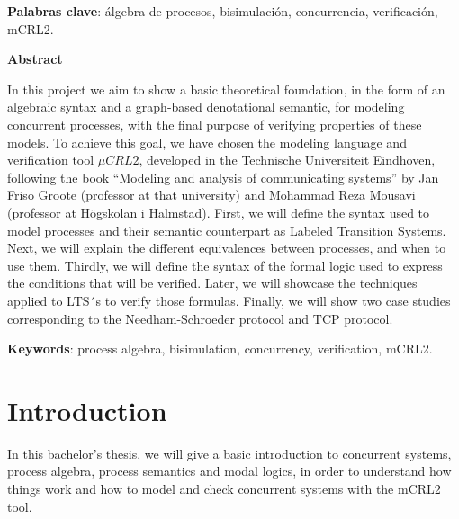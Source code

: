 \documentclass[11pt]{article}
\theoremstyle{definition}
\theoremstyle{plain}
\theoremstyle{definition}
\begin{document}
\textbf{Palabras clave}: álgebra de procesos, bisimulación, concurrencia, verificación, mCRL2.

\begin{center}
\textbf{Abstract}
\end{center}

In this project we aim to show a basic theoretical foundation, in the form of an algebraic syntax and a graph-based denotational semantic, for modeling concurrent processes, with the final purpose of verifying properties of these models. To achieve this goal, we have chosen the modeling language and verification tool $\mu CRL2$, developed in the Technische Universiteit Eindhoven, following the book ``Modeling and analysis of communicating systems'' by Jan Friso Groote (professor at that university) and Mohammad Reza Mousavi (professor at Högskolan i Halmstad). First, we will define the syntax used to model processes and their semantic counterpart as Labeled Transition Systems. Next, we will explain the different  equivalences between processes, and when to use them. Thirdly, we will define the syntax of the formal logic used to express the conditions that will be verified. Later, we will showcase the techniques applied to LTS´s to verify those formulas. Finally, we will show two case studies corresponding to the Needham-Schroeder protocol and TCP protocol.

\textbf{Keywords}: process algebra, bisimulation, concurrency, verification, mCRL2.
\clearpage
\tableofcontents

\clearpage


\section{Introduction}
In this bachelor’s thesis, we will give a basic introduction to concurrent systems, process algebra, process semantics and modal logics, in order to understand how things work and how to model and check concurrent systems with the mCRL2 tool.
\end{document}
